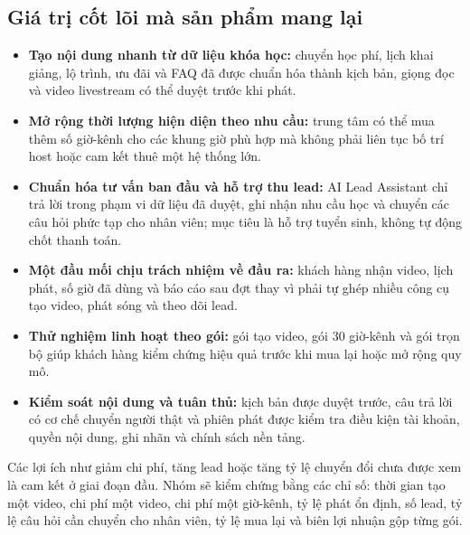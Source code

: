 \subsection{Giá trị cốt lõi mà sản phẩm mang lại}

\begin{itemize}
    \item \textbf{Tạo nội dung nhanh từ dữ liệu khóa học:} chuyển học phí, lịch
    khai giảng, lộ trình, ưu đãi và FAQ đã được chuẩn hóa thành kịch bản, giọng
    đọc và video livestream có thể duyệt trước khi phát.
    \item \textbf{Mở rộng thời lượng hiện diện theo nhu cầu:} trung tâm có thể
    mua thêm số giờ-kênh cho các khung giờ phù hợp mà không phải liên tục bố trí
    host hoặc cam kết thuê một hệ thống lớn.
    \item \textbf{Chuẩn hóa tư vấn ban đầu và hỗ trợ thu lead:} AI Lead Assistant
    chỉ trả lời trong phạm vi dữ liệu đã duyệt, ghi nhận nhu cầu học và chuyển
    các câu hỏi phức tạp cho nhân viên; mục tiêu là hỗ trợ tuyển sinh, không tự
    động chốt thanh toán.
    \item \textbf{Một đầu mối chịu trách nhiệm về đầu ra:} khách hàng nhận video,
    lịch phát, số giờ đã dùng và báo cáo sau đợt thay vì phải tự ghép nhiều công
    cụ tạo video, phát sóng và theo dõi lead.
    \item \textbf{Thử nghiệm linh hoạt theo gói:} gói tạo video, gói 30 giờ-kênh
    và gói trọn bộ giúp khách hàng kiểm chứng hiệu quả trước khi mua lại hoặc mở
    rộng quy mô.
    \item \textbf{Kiểm soát nội dung và tuân thủ:} kịch bản được duyệt trước,
    câu trả lời có cơ chế chuyển người thật và phiên phát được kiểm tra điều kiện
    tài khoản, quyền nội dung, ghi nhãn và chính sách nền tảng.
\end{itemize}

Các lợi ích như giảm chi phí, tăng lead hoặc tăng tỷ lệ chuyển đổi chưa được xem
là cam kết ở giai đoạn đầu. Nhóm sẽ kiểm chứng bằng các chỉ số: thời gian tạo một
video, chi phí một video, chi phí một giờ-kênh, tỷ lệ phát ổn định, số lead, tỷ lệ
câu hỏi cần chuyển cho nhân viên, tỷ lệ mua lại và biên lợi nhuận gộp từng gói.
